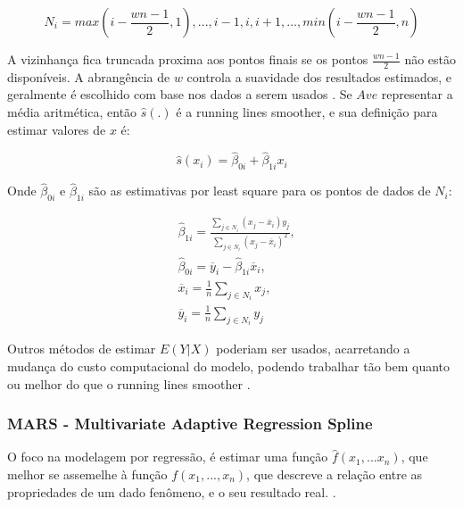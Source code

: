 \documentclass[
    12pt,               %
    openright,          %
    oneside,            %
    a4paper,            %
    english,            %
    brazil              %
    ]{abntex2}
\begin{document}
\begin{equation}
    \label{eq_vizinhanaça}
    N_i = {max(i-\frac{wn-1}{2},1),...,i-1,i,i+1,...,min(i-\frac{wn-1}{2},n)}
\end{equation}

A vizinhança fica truncada proxima aos pontos finais se os pontos $\frac{wn-1}{2}$ não estão disponíveis. A abrangência de $w$
controla a suavidade dos resultados estimados, e geralmente é escolhido com base nos dados a serem usados \cite{GAM}. Se
$Ave$ representar a média aritmética, então $\hat{s}(.)$ é a running lines smoother, e sua definição para estimar valores
de $x$ é:

\begin{equation}
    \label{running_lines_smoother}
    \hat{s}(x_i) = \hat{\beta}_{0i} + \hat{\beta}_{1i}x_i
\end{equation}

Onde $\hat{\beta}_{0i}$ e $\hat{\beta}_{1i}$ são as estimativas por least square para os pontos de dados de $N_i$:

\begin{equation}
    \label{least_square_betas}
    \begin{split}
        &\hat{\beta}_{1i} = \frac{\sum_{j \in N_i}(x_j - \overline{x}_i)y_j}{\sum_{j \in N_i}(x_j - \overline{x}_i)^2}, \\
        &\hat{\beta}_{0i} = \overline{y}_i - \hat{\beta}_{1i}\overline{x}_i, \\
        &\overline{x}_i = \frac{1}{n}\sum_{j \in N_i}x_j, \\
        &\overline{y}_i = \frac{1}{n}\sum_{j \in N_i}y_j
    \end{split}
\end{equation}

Outros métodos de estimar $E(Y|X)$ poderiam ser usados, acarretando a mudança do custo computacional do modelo, podendo
trabalhar tão bem quanto ou melhor do que o running lines smoother \cite{GAM}.

\subsubsection{MARS - Multivariate Adaptive Regression Spline}

O foco na modelagem por regressão, é estimar uma função $\hat{f}(x_1,...x_n)$, que melhor se assemelhe à função 
$f(x_1,...,x_n)$, que descreve a relação entre as propriedades de um dado fenômeno, e o seu resultado real.
\cite{MARS}. 
\end{document}
